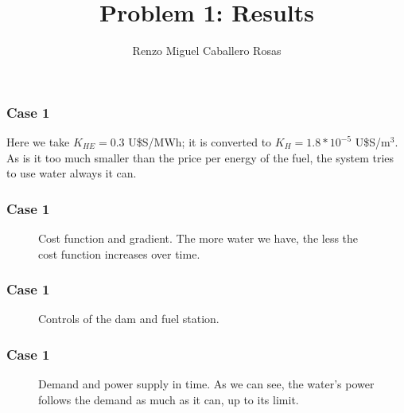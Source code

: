 \documentclass[aspectratio=169]{beamer}\usepackage[utf8]{inputenc}
\title{Problem 1: Results}
\subtitle{Renzo Miguel Caballero Rosas}
\begin{document}
\begin{frame}
\titlepage
\end{frame}

\begin{frame}\frametitle{Case 1}
Here we take $K_{HE}=0.3$ U\$S/MWh; it is converted to $K_H=1.8*10^{-5}$ U\$S/m$^3$. As is it too much smaller than the price per energy of the fuel, the system tries to use water always it can.
\end{frame}

\begin{frame}\frametitle{Case 1}
\begin{figure}[ht!]
\centering
{}
\caption{Cost function and gradient. The more water we have, the less the cost function increases over time.}
\end{figure}
\end{frame}

\begin{frame}\frametitle{Case 1}
\begin{figure}[ht!]
\centering
{}
\caption{Controls of the dam and fuel station.}
\end{figure}
\end{frame}

\begin{frame}\frametitle{Case 1}
\begin{figure}[ht!]
\centering
{}
\caption{Demand and power supply in time. As we can see, the water's power follows the demand as much as it can, up to its limit.}
\end{figure}
\end{frame}
\end{document}
